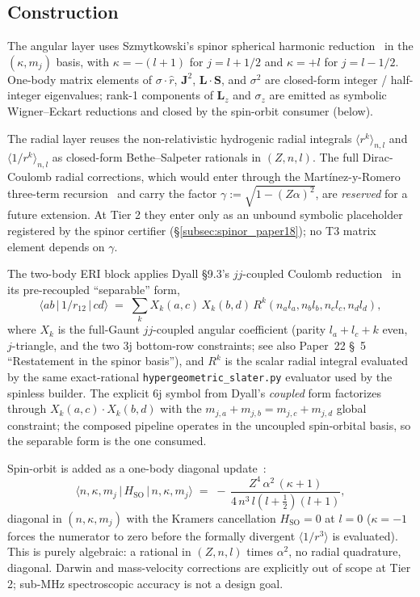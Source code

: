 \documentclass[aps,pra,twocolumn,superscriptaddress,longbibliography]{revtex4-2}
\begin{document}
\subsection{Construction}
\label{subsec:spinor_construction}

The angular layer uses Szmytkowski's spinor spherical harmonic
reduction~\cite{Szmytkowski2007} in the $(\kappa, m_j)$ basis,
with $\kappa = -(l+1)$ for $j = l + 1/2$ and $\kappa = +l$ for
$j = l - 1/2$. One-body matrix elements of $\sigma \cdot \hat{r}$,
$\mathbf{J}^2$, $\mathbf{L}\cdot\mathbf{S}$, and $\sigma^2$ are
closed-form integer / half-integer eigenvalues; rank-1 components of
$\mathbf{L}_z$ and $\sigma_z$ are emitted as symbolic Wigner--Eckart
reductions and closed by the spin-orbit consumer (below).

The radial layer reuses the non-relativistic hydrogenic radial
integrals $\langle r^k \rangle_{n,l}$ and $\langle 1/r^k \rangle_{n,l}$
as closed-form Bethe--Salpeter rationals in $(Z, n, l)$. The full
Dirac-Coulomb radial corrections, which would enter through the
Martínez-y-Romero three-term recursion~\cite{MartinezYRomero2004} and
carry the factor $\gamma := \sqrt{1 - (Z\alpha)^2}$, are \emph{reserved}
for a future extension. At Tier 2 they enter only as an unbound
symbolic placeholder registered by the spinor certifier
(\S\ref{subsec:spinor_paper18}); no T3 matrix element depends on $\gamma$.

The two-body ERI block applies Dyall \S 9.3's $jj$-coupled Coulomb
reduction~\cite{Dyall} in its pre-recoupled ``separable'' form,
\[
  \langle a b \,|\, 1/r_{12} \,|\, c d \rangle
  \;=\; \sum_k X_k(a, c)\, X_k(b, d)\, R^k(n_a l_a, n_b l_b, n_c l_c, n_d l_d),
\]
where $X_k$ is the full-Gaunt $jj$-coupled angular coefficient
(parity $l_a + l_c + k$ even, $j$-triangle, and the two 3j bottom-row
constraints; see also Paper~22 \S~5 ``Restatement in the spinor basis''),
and $R^k$ is the
scalar radial integral evaluated by the same exact-rational
\texttt{hypergeometric\_slater.py} evaluator used by the spinless
builder. The explicit 6j symbol from Dyall's \emph{coupled} form
factorizes through $X_k(a,c) \cdot X_k(b,d)$ with the
$m_{j,a} + m_{j,b} = m_{j,c} + m_{j,d}$ global constraint; the
composed pipeline operates in the uncoupled spin-orbital basis, so
the separable form is the one consumed.

Spin-orbit is added as a one-body diagonal update~\cite{BreitPauli}:
\[
  \langle n, \kappa, m_j \,|\, H_{\mathrm{SO}} \,|\, n, \kappa, m_j \rangle
  \;=\; -\,\frac{Z^4\,\alpha^2\,(\kappa+1)}{4\,n^3\, l(l+\tfrac{1}{2})(l+1)},
\]
diagonal in $(n, \kappa, m_j)$ with the Kramers cancellation
$H_{\mathrm{SO}} = 0$ at $l = 0$ ($\kappa = -1$ forces the numerator
to zero before the formally divergent $\langle 1/r^3\rangle$ is
evaluated). This is purely algebraic: a rational in $(Z, n, l)$
times $\alpha^2$, no radial quadrature, diagonal. Darwin and
mass-velocity corrections are explicitly out of scope at Tier 2;
sub-MHz spectroscopic accuracy is not a design goal.
\end{document}

